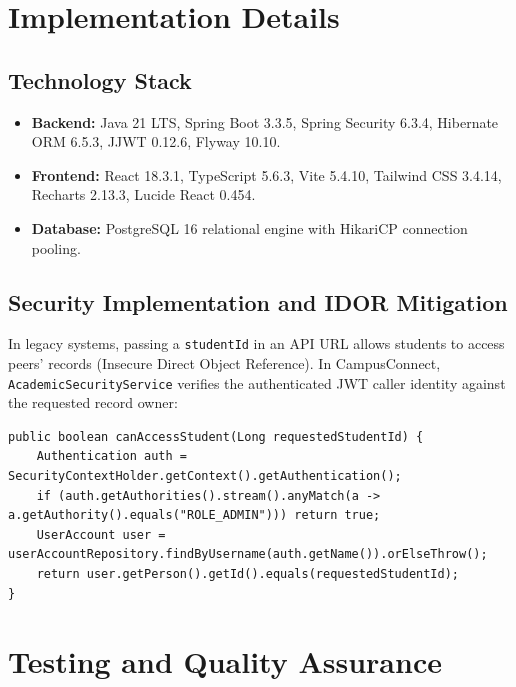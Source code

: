 \documentclass[12pt,a4paper,oneside]{report}
\begin{document}
\chapter{Implementation Details}

\section{Technology Stack}
\begin{itemize}
    \item \textbf{Backend:} Java 21 LTS, Spring Boot 3.3.5, Spring Security 6.3.4, Hibernate ORM 6.5.3, JJWT 0.12.6, Flyway 10.10.
    \item \textbf{Frontend:} React 18.3.1, TypeScript 5.6.3, Vite 5.4.10, Tailwind CSS 3.4.14, Recharts 2.13.3, Lucide React 0.454.
    \item \textbf{Database:} PostgreSQL 16 relational engine with HikariCP connection pooling.
\end{itemize}

\section{Security Implementation and IDOR Mitigation}
In legacy systems, passing a \texttt{studentId} in an API URL allows students to access peers' records (Insecure Direct Object Reference). In CampusConnect, \texttt{AcademicSecurityService} verifies the authenticated JWT caller identity against the requested record owner:
\begin{lstlisting}
public boolean canAccessStudent(Long requestedStudentId) {
    Authentication auth = SecurityContextHolder.getContext().getAuthentication();
    if (auth.getAuthorities().stream().anyMatch(a -> a.getAuthority().equals("ROLE_ADMIN"))) return true;
    UserAccount user = userAccountRepository.findByUsername(auth.getName()).orElseThrow();
    return user.getPerson().getId().equals(requestedStudentId);
}
\end{lstlisting}

\chapter{Testing and Quality Assurance}
\end{document}
